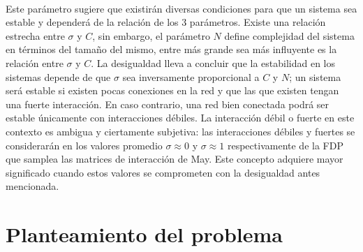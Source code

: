 \\
Este parámetro sugiere que existirán diversas condiciones para que un sistema sea estable y dependerá de la relación de los 3 parámetros. Existe una relación estrecha entre $\sigma$ y $C$, sin embargo, el parámetro $N$ define complejidad del sistema en términos del tamaño del mismo, entre más grande sea más influyente es la relación entre $\sigma$ y $C$. La desigualdad lleva a concluir que la estabilidad en los sistemas depende de que $\sigma$ sea inversamente proporcional a $C$ y $N$; un sistema será estable si existen pocas conexiones en la red y que las que existen tengan una fuerte interacción. En caso contrario, una red bien conectada podrá ser estable únicamente con interacciones débiles. La interacción débil o fuerte en este contexto es ambigua y ciertamente subjetiva: las interacciones débiles y fuertes se considerarán en los valores promedio $\sigma\approx 0$ y $\sigma\approx 1$ respectivamente de la FDP que samplea las matrices de interacción de May. Este concepto adquiere mayor significado cuando estos valores se comprometen con la desigualdad antes mencionada.

\section{Planteamiento del problema}

